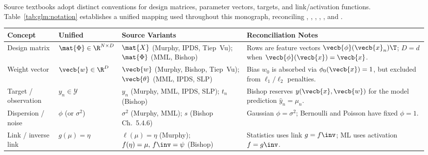 \documentclass[../../../../master.tex]{subfiles}
\begin{document}
\begin{crossbook}
Source textbooks adopt distinct conventions for design matrices, parameter vectors, targets, and link/activation functions. Table~\ref{tab:glm:notation} establishes a unified mapping used throughout this monograph, reconciling , , , , , and .
\begin{center}
\small
\setlength{\tabcolsep}{4pt}
\begin{tabularx}{\linewidth}{@{} >{\raggedright\arraybackslash}p{2.2cm} >{\raggedright\arraybackslash}p{2.0cm} >{\raggedright\arraybackslash}p{3.0cm} >{\raggedright\arraybackslash}X @{}}
\toprule
\textbf{Concept} & \textbf{Unified} & \textbf{Source Variants} & \textbf{Reconciliation Notes} \\
\midrule
Design matrix & $\mat{\Phi} \in \R^{N \times D}$ & $\mat{X}$ (Murphy, IPDS, Tiep~Vu); $\mat{\Phi}$ (MML, Bishop) & Rows are feature vectors $\vecb{\phi}(\vecb{x}_n)\T$; $D=d$ when $\vecb{\phi}(\vecb{x})=\vecb{x}$. \\
Weight vector & $\vecb{w} \in \R^D$ & $\vecb{w}$ (Murphy, Bishop, Tiep~Vu); $\vecb{\theta}$ (MML, IPDS, SLP) & Bias $w_0$ is absorbed via $\phi_0(\vecb{x})=1$, but excluded from $\ell_1/\ell_2$ penalties. \\
Target / observation & $y_n \in \mathcal{Y}$ & $y_n$ (Murphy, MML, IPDS, SLP); $t_n$ (Bishop) & Bishop reserves $y(\vecb{x},\vecb{w})$ for the model prediction $\hat{y}_n = \mu_n$. \\
Dispersion / noise & $\phi$ (or $\sigma^2$) & $\sigma^2$ (Murphy, MML); $s$ (Bishop Ch.~5.4.6) & Gaussian $\phi = \sigma^2$; Bernoulli and Poisson have fixed $\phi = 1$. \\
Link / inverse link & $g(\mu) = \eta$ & $\ell(\mu) = \eta$ (Murphy); $f(\eta)=\mu,\, f\inv=\psi$ (Bishop) & Statistics uses link $g=f\inv$; ML uses activation $f = g\inv$. \\
\bottomrule
\end{tabularx}
\end{center}
\label{tab:glm:notation}
\end{crossbook}
\end{document}
